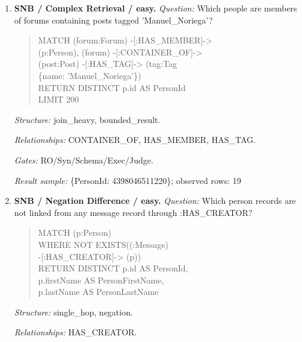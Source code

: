 \begin{enumerate}
\begin{quote}
MATCH (forum) -[:CONTAINER\_OF]-\textgreater{}\\
(post:Post)\\
RETURN DISTINCT COUNT(DISTINCT post) AS\\
JoinedForumPostCount
\end{quote}
\textit{Structure:} join\_heavy, aggregation.\par
\textit{Relationships:} CONTAINER\_OF, HAS\_MEMBER.\par
\textit{Gates:} RO/Syn/Schema/Exec/Judge.\par
\textit{Result sample:} \{JoinedForumPostCount: 1\}; observed rows: 1
\item \textbf{SNB / Complex Retrieval / easy.}
\textit{Question:} Which people are members of forums containing posts tagged 'Manuel\_Noriega'?
\begin{quote}\scriptsize\ttfamily\raggedright\sloppy
MATCH (forum:Forum) -[:HAS\_MEMBER]-\textgreater{}\\
(p:Person), (forum) -[:CONTAINER\_OF]-\textgreater{}\\
(post:Post) -[:HAS\_TAG]-\textgreater{} (tag:Tag\\
\{name: 'Manuel\_Noriega'\})\\
RETURN DISTINCT p.id AS PersonId\\
LIMIT 200
\end{quote}
\textit{Structure:} join\_heavy, bounded\_result.\par
\textit{Relationships:} CONTAINER\_OF, HAS\_MEMBER, HAS\_TAG.\par
\textit{Gates:} RO/Syn/Schema/Exec/Judge.\par
\textit{Result sample:} \{PersonId: 4398046511220\}; observed rows: 19
\item \textbf{SNB / Negation Difference / easy.}
\textit{Question:} Which person records are not linked from any message record through :HAS\_CREATOR?
\begin{quote}\scriptsize\ttfamily\raggedright\sloppy
MATCH (p:Person)\\
WHERE NOT EXISTS((:Message)\\
-[:HAS\_CREATOR]-\textgreater{} (p))\\
RETURN DISTINCT p.id AS PersonId,\\
p.firstName AS PersonFirstName,\\
p.lastName AS PersonLastName
\end{quote}
\textit{Structure:} single\_hop, negation.\par
\textit{Relationships:} HAS\_CREATOR.\par

\end{enumerate}
